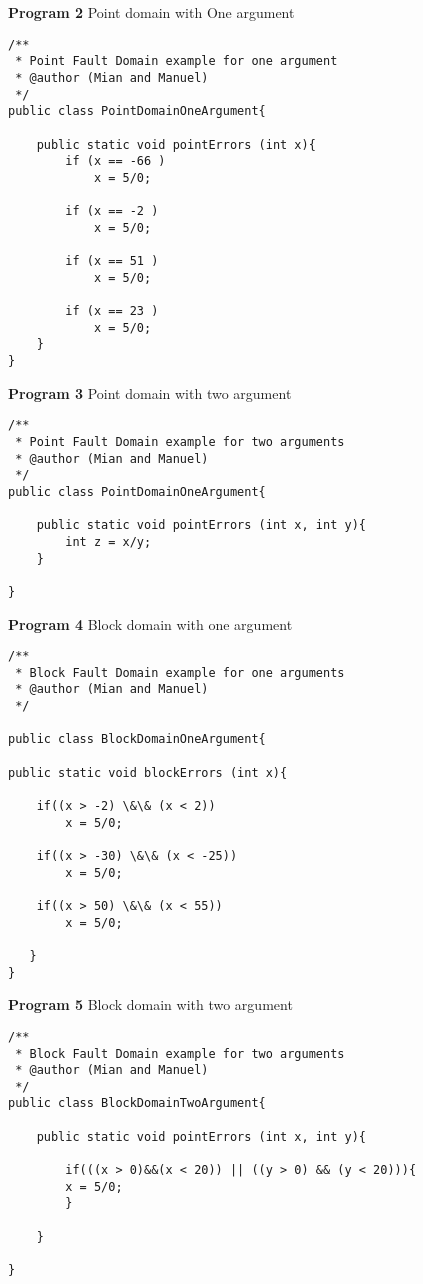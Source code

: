 \textbf{Program 2} Point domain with One argument
\begin{lstlisting} 
/**
 * Point Fault Domain example for one argument
 * @author (Mian and Manuel)
 */
public class PointDomainOneArgument{

	public static void pointErrors (int x){
		if (x == -66 )
			x = 5/0;

		if (x == -2 )
			x = 5/0;

		if (x == 51 )
			x = 5/0;

		if (x == 23 )
			x = 5/0;
	}
}
\end{lstlisting}
\textbf{Program 3} Point domain with two argument
\begin{lstlisting}
/**
 * Point Fault Domain example for two arguments
 * @author (Mian and Manuel)
 */
public class PointDomainOneArgument{

	public static void pointErrors (int x, int y){
		int z = x/y;
	}

}
\end{lstlisting}

\textbf{Program 4} Block domain with one argument
\begin{lstlisting}
/**
 * Block Fault Domain example for one arguments
 * @author (Mian and Manuel)
 */

public class BlockDomainOneArgument{

public static void blockErrors (int x){
	
	if((x > -2) \&\& (x < 2))
		x = 5/0;
	
	if((x > -30) \&\& (x < -25))
		x = 5/0;
	
	if((x > 50) \&\& (x < 55))
		x = 5/0;

   }
}

\end{lstlisting}
\textbf{Program 5} Block domain with two argument
\begin{lstlisting}
/**
 * Block Fault Domain example for two arguments
 * @author (Mian and Manuel)
 */
public class BlockDomainTwoArgument{

	public static void pointErrors (int x, int y){

		if(((x > 0)&&(x < 20)) || ((y > 0) && (y < 20))){
		x = 5/0;
		}
  	
	}

}
\end{lstlisting}


